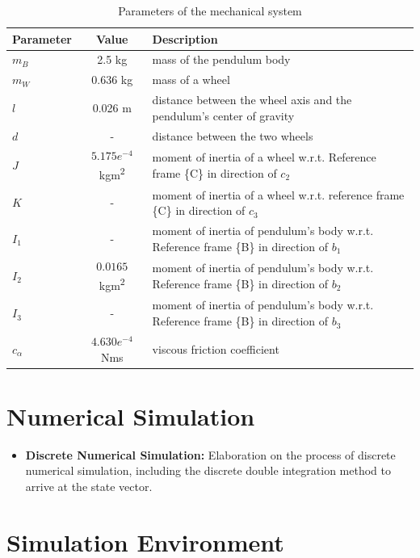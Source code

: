 	\begin{table}[h!]
		\centering
		\caption{Parameters of the mechanical system}
		\label{tab:parameters}
		\begin{tabular}{lcl}
			\toprule
			Parameter & Value & Description \\
			\midrule
			$m_B$ & 2.5 kg & mass of the pendulum body \\
			$m_W$ & 0.636 kg & mass of a wheel \\
			$l$ & 0.026 m & distance between the wheel axis and the pendulum's center of gravity \\
			$d$ & - & distance between the two wheels \\
			$J$ & \(5.175 e^{-4}\) kgm\textsuperscript{2} & moment of inertia of a wheel w.r.t. Reference frame \{C\} in direction of \(c_2\) \\
			$K$ & - & moment of inertia of a wheel w.r.t. reference frame \{C\} in direction of \(c_3\) \\
			$I_1$ & - & moment of inertia of pendulum's body w.r.t. Reference frame \{B\} in direction of \(b_1\) \\
			$I_2$ & \(0.0165\) kgm\textsuperscript{2} & moment of inertia of pendulum's body w.r.t. Reference frame \{B\} in direction of \(b_2\) \\
			$I_3$ & - & moment of inertia of pendulum's body w.r.t. Reference frame \{B\} in direction of \(b_3\) \\
			$c_\alpha$ & \(4.630 e^{-4}\) Nms & viscous friction coefficient \\
			\bottomrule
		\end{tabular}
	\end{table}
	
	
	



\section{Numerical Simulation}
\begin{itemize}
	\item \textbf{Discrete Numerical Simulation:} Elaboration on the process of discrete numerical simulation, including the discrete double integration method to arrive at the state vector.
\end{itemize}

\section{Simulation Environment}
